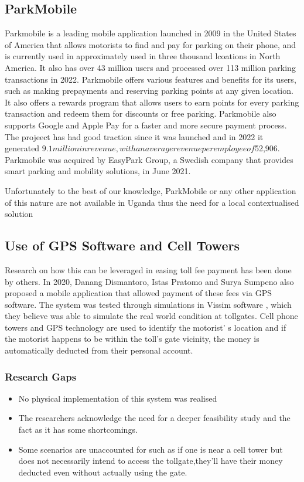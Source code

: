 \subsection{ParkMobile}
Parkmobile is a leading mobile application launched in 2009 in the United States of America that allows motorists to find and pay for parking on their phone, and is currently used in approximately used in three thousand lcoations in North America. It also has over 43 million users and processed over 113 million parking transactions in 2022.
Parkmobile offers various features and benefits for its users, such as making prepayments and reserving parking points at any given location. It also offers a rewards program that allows users to earn points for every parking transaction and redeem them for discounts or free parking. Parkmobile also supports Google and Apple Pay for a faster and more secure payment process. \cite{parkmobile_2022}
The projeect has had good traction since it was launched and  in 2022 it generated $9.1 million in revenue , with an average revenue per employee of $52,906. Parkmobile was acquired by EasyPark Group, a Swedish company that provides smart parking and mobility solutions, in June 2021.

Unfortunately to the best of our knowledge, ParkMobile or any other application of this nature are not available in Uganda thus the need for a local contextualised solution

\subsection{Use of GPS Software and Cell Towers}
Research on how this can be leveraged in easing toll fee payment has been done by others. In 2020, Danang Dismantoro, Istas Pratomo and Surya Sumpeno also proposed a mobile application that allowed payment of these fees via GPS software\cite{el-rabbany_introduction_2002,dismantoro_minimizing_2020}. The system was tested through simulations in Vissim software \cite{ptv_vissim_traffic_2022}, which they believe was able to simulate the real world condition at tollgates. Cell phone towers and GPS technology are used to identify the motorist’ s location and if the motorist happens to be within the toll’s gate vicinity, the money is automatically deducted from their personal account.

\subsubsection{Research Gaps}
\begin{itemize}
    \item No physical implementation of this system was realised
    \item The researchers acknowledge the need for a deeper feasibility study and the fact as it has some shortcomings.
    \item Some scenarios are unaccounted for such as if one is near a cell tower but does not necessarily intend to access the tollgate,they’ll have their money deducted even without actually using the gate.
\end{itemize}

